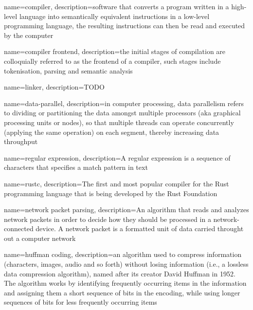 
\makeglossaries

\renewcommand*{\glstextformat}[1]{\textcolor{black}{%
\mbox{#1}}}

{
    name=compiler,
    description={software that converts a program written in a high-level
language into semantically equivalent instructions in a low-level programming
language, the resulting instructions can then be read and executed by the
computer}
}

{
    name=compiler frontend,
    description={the initial stages of compilation are colloquially referred
to as the frontend of a compiler, such stages include tokenisation, parsing and
semantic analysis}
}

{
    name=linker,
    description={TODO}
}

{
    name=data-parallel,
    description={in computer processing, data parallelism refers to dividing or partitioning the
data amongst multiple processors (aka graphical processing units or nodes), so
that multiple threads can operate concurrently (applying the same operation) on
each segment, thereby increasing data throughput}
}

{
    name=regular expression,
    description={A regular expression is a sequence of characters that specifies
a match pattern in text}
}

{
    name=rustc,
    description={The first and most popular compiler for the Rust programming
language that is being developed by the Rust Foundation}
}

 {
    name=network packet parsing,
    description={An algorithm that reads and analyzes network packets in order
to decide how they should be processed in a network-connected device. A network
packet is a formatted unit of data carried throught out a computer network}
}

{
    name=huffman coding,
    description={an algorithm used to compress information (characters,
images, audio and so forth) without losing information (i.e., a lossless data
compression algorithm), named after its creator David Huffman in 1952. The
algorithm works by identifying frequently occurring items in the information
and assigning them a short sequence of bits in the encoding, while using longer
sequences of bits for less frequently occurring items}
}

